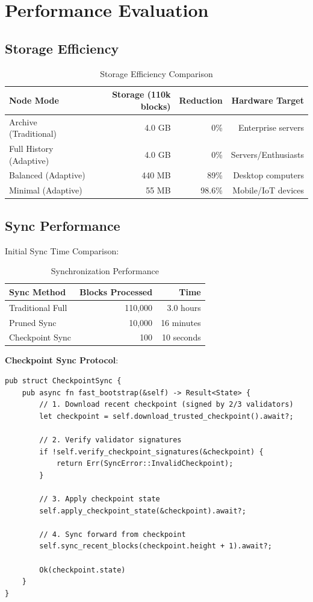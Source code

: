 \documentclass[11pt,a4paper]{article}
\begin{document}
\section{Performance Evaluation}

\subsection{Storage Efficiency}

\begin{table}[h]
\centering
\begin{tabular}{lrrr}
\toprule
\textbf{Node Mode} & \textbf{Storage (110k blocks)} & \textbf{Reduction} & \textbf{Hardware Target} \\
\midrule
Archive (Traditional) & 4.0 GB & 0\% & Enterprise servers \\
Full History (Adaptive) & 4.0 GB & 0\% & Servers/Enthusiasts \\
Balanced (Adaptive) & 440 MB & 89\% & Desktop computers \\
Minimal (Adaptive) & 55 MB & 98.6\% & Mobile/IoT devices \\
\bottomrule
\end{tabular}
\caption{Storage Efficiency Comparison}
\end{table}

\subsection{Sync Performance}

Initial Sync Time Comparison:

\begin{table}[h]
\centering
\begin{tabular}{lrr}
\toprule
\textbf{Sync Method} & \textbf{Blocks Processed} & \textbf{Time} \\
\midrule
Traditional Full & 110,000 & 3.0 hours \\
Pruned Sync & 10,000 & 16 minutes \\
Checkpoint Sync & 100 & 10 seconds \\
\bottomrule
\end{tabular}
\caption{Synchronization Performance}
\end{table}

\textbf{Checkpoint Sync Protocol}:

\begin{lstlisting}
pub struct CheckpointSync {
    pub async fn fast_bootstrap(&self) -> Result<State> {
        // 1. Download recent checkpoint (signed by 2/3 validators)
        let checkpoint = self.download_trusted_checkpoint().await?;

        // 2. Verify validator signatures
        if !self.verify_checkpoint_signatures(&checkpoint) {
            return Err(SyncError::InvalidCheckpoint);
        }

        // 3. Apply checkpoint state
        self.apply_checkpoint_state(&checkpoint).await?;

        // 4. Sync forward from checkpoint
        self.sync_recent_blocks(checkpoint.height + 1).await?;

        Ok(checkpoint.state)
    }
}
\end{lstlisting}
\end{document}
